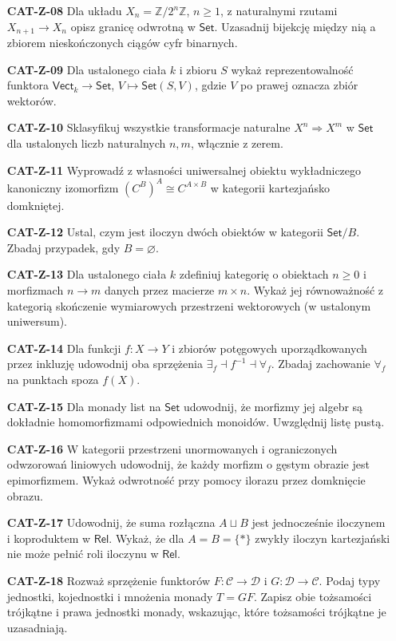 \documentclass[11pt,a4paper]{article}
\newcommand{\Set}{\mathsf{Set}}
\newcommand{\Rel}{\mathsf{Rel}}
\newcommand{\Vect}{\mathsf{Vect}}
\begin{document}
\begin{enumerate}
\item[\textbf{CAT-Z-08}] Dla układu $X_n=\mathbb Z/2^n\mathbb Z$, $n\geq1$, z naturalnymi rzutami $X_{n+1}\to X_n$ opisz granicę odwrotną w $\Set$. Uzasadnij bijekcję między nią a zbiorem nieskończonych ciągów cyfr binarnych.
\item[\textbf{CAT-Z-09}] Dla ustalonego ciała $k$ i zbioru $S$ wykaż reprezentowalność funktora $\Vect_k\to\Set$, $V\mapsto\Set(S,V)$, gdzie $V$ po prawej oznacza zbiór wektorów.
\item[\textbf{CAT-Z-10}] Sklasyfikuj wszystkie transformacje naturalne $X^n\Rightarrow X^m$ w $\Set$ dla ustalonych liczb naturalnych $n,m$, włącznie z zerem.
\item[\textbf{CAT-Z-11}] Wyprowadź z własności uniwersalnej obiektu wykładniczego kanoniczny izomorfizm $(C^B)^A\cong C^{A\times B}$ w kategorii kartezjańsko domkniętej.
\item[\textbf{CAT-Z-12}] Ustal, czym jest iloczyn dwóch obiektów w kategorii $\Set/B$. Zbadaj przypadek, gdy $B=\varnothing$.
\item[\textbf{CAT-Z-13}] Dla ustalonego ciała $k$ zdefiniuj kategorię o obiektach $n\geq0$ i morfizmach $n\to m$ danych przez macierze $m\times n$. Wykaż jej równoważność z kategorią skończenie wymiarowych przestrzeni wektorowych (w ustalonym uniwersum).
\item[\textbf{CAT-Z-14}] Dla funkcji $f:X\to Y$ i zbiorów potęgowych uporządkowanych przez inkluzję udowodnij oba sprzężenia $\exists_f\dashv f^{-1}\dashv\forall_f$. Zbadaj zachowanie $\forall_f$ na punktach spoza $f(X)$.
\item[\textbf{CAT-Z-15}] Dla monady list na $\Set$ udowodnij, że morfizmy jej algebr są dokładnie homomorfizmami odpowiednich monoidów. Uwzględnij listę pustą.
\item[\textbf{CAT-Z-16}] W kategorii przestrzeni unormowanych i ograniczonych odwzorowań liniowych udowodnij, że każdy morfizm o gęstym obrazie jest epimorfizmem. Wykaż odwrotność przy pomocy ilorazu przez domknięcie obrazu.
\item[\textbf{CAT-Z-17}] Udowodnij, że suma rozłączna $A\sqcup B$ jest jednocześnie iloczynem i koproduktem w $\Rel$. Wykaż, że dla $A=B=\{*\}$ zwykły iloczyn kartezjański nie może pełnić roli iloczynu w $\Rel$.
\item[\textbf{CAT-Z-18}] Rozważ sprzężenie funktorów $F:\mathcal C\to\mathcal D$ i $G:\mathcal D\to\mathcal C$. Podaj typy jednostki, kojednostki i mnożenia monady $T=GF$. Zapisz obie tożsamości trójkątne i prawa jednostki monady, wskazując, które tożsamości trójkątne je uzasadniają.
\end{enumerate}
\newpage
\end{document}
